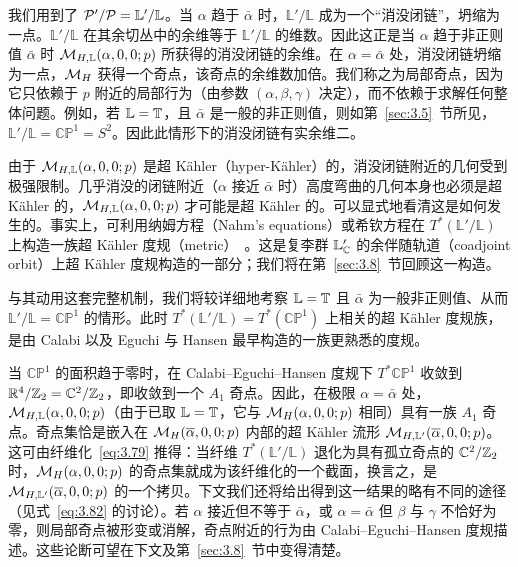 我们用到了 $\mathcal{P}'/\mathcal{P}=\mathbb{L}'/\mathbb{L}$。当 $\alpha$ 趋于 $\bar\alpha$ 时，$\mathbb{L}'/\mathbb{L}$ 成为一个“消没闭链”，坍缩为一点。$\mathbb{L}'/\mathbb{L}$ 在其余切丛中的余维等于 $\mathbb{L}'/\mathbb{L}$ 的维数。因此这正是当 $\alpha$ 趋于非正则值 $\bar\alpha$ 时 ${\mathcal{M}}_{H,\mathbb{L}}(\alpha,0,0;p)$ 所获得的消没闭链的余维。在 $\alpha=\bar\alpha$ 处，消没闭链坍缩为一点，${{\mathcal{M}}_H}$ 获得一个奇点，该奇点的余维数加倍。我们称之为局部奇点，因为它只依赖于 $p$ 附近的局部行为（由参数 $(\alpha,\beta,\gamma)$ 决定），而不依赖于求解任何整体问题。例如，若 $\mathbb{L}={\mathbb{T}}$，且 $\bar\alpha$ 是一般的非正则值，则如第~\ref{sec:3.5}~节所见，$\mathbb{L}'/\mathbb{L}=\mathbb{CP}^1=S^2$。因此此情形下的消没闭链有实余维二。

由于 ${\mathcal{M}}_{H,\mathbb{L}}(\alpha,0,0;p)$ 是超 Kähler（hyper-Kähler）的，消没闭链附近的几何受到极强限制。几乎消没的闭链附近（$\alpha$ 接近 $\bar\alpha$ 时）高度弯曲的几何本身也必须是超 Kähler 的，${\mathcal{M}}_{H,\mathbb{L}}(\alpha,0,0;p)$ 才可能是超 Kähler 的。可以显式地看清这是如何发生的。事实上，可利用纳姆方程（Nahm's equations）或希钦方程在 $T^*(\mathbb{L}'/\mathbb{L})$ 上构造一族超 Kähler 度规（metric）~\cite{ref34}。这是复李群 $\mathbb{L}'_{\mathbb{C}}$ 的余伴随轨道（coadjoint orbit）上超 Kähler 度规构造的一部分；我们将在第~\ref{sec:3.8}~节回顾这一构造。

与其动用这套完整机制，我们将较详细地考察 $\mathbb{L}={\mathbb{T}}$ 且 $\bar\alpha$ 为一般非正则值、从而 $\mathbb{L}'/\mathbb{L}=\mathbb{CP}^1$ 的情形。此时 $T^*(\mathbb{L}'/\mathbb{L})=T^*(\mathbb{CP}^1)$ 上相关的超 Kähler 度规族，是由 Calabi 以及 Eguchi 与 Hansen 最早构造的一族更熟悉的度规。

当 $\mathbb{CP}^1$ 的面积趋于零时，在 Calabi–Eguchi–Hansen 度规下 $T^*\mathbb{CP}^1$ 收敛到 ${\mathbb{R}}^4/{\mathbb{Z}}_2={\mathbb{C}}^2/{\mathbb{Z}}_2$，即收敛到一个 $A_1$ 奇点。因此，在极限 $\alpha=\bar\alpha$ 处，${\mathcal{M}}_{H,\mathbb{L}}(\alpha,0,0;p)$（由于已取 $\mathbb{L}={\mathbb{T}}$，它与 ${{\mathcal{M}}_H}(\alpha,0,0;p)$ 相同）具有一族 $A_1$ 奇点。奇点集恰是嵌入在 ${\mathcal{M}}_H(\overline\alpha,0,0;p)$ 内部的超 Kähler 流形 ${\mathcal{M}}_{H,\mathbb{L}'}(\overline\alpha,0,0;p)$。这可由纤维化~\eqref{eq:3.79} 推得：当纤维 $T^*(\mathbb{L}'/\mathbb{L})$ 退化为具有孤立奇点的 ${\mathbb{C}}^2/{\mathbb{Z}}_2$ 时，${\mathcal{M}}_H(\alpha,0,0;p)$ 的奇点集就成为该纤维化的一个截面，换言之，是 ${\mathcal{M}}_{H,\mathbb{L}'}(\overline\alpha,0,0;p)$ 的一个拷贝。下文我们还将给出得到这一结果的略有不同的途径（见式~\eqref{eq:3.82} 的讨论）。若 $\alpha$ 接近但不等于 $\bar\alpha$，或 $\alpha=\bar\alpha$ 但 $\beta$ 与 $\gamma$ 不恰好为零，则局部奇点被形变或消解，奇点附近的行为由 Calabi–Eguchi–Hansen 度规描述。这些论断可望在下文及第~\ref{sec:3.8}~节中变得清楚。

